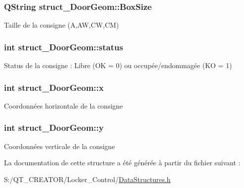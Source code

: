 \subsubsection[{Box\+Size}]{\setlength{\rightskip}{0pt plus 5cm}Q\+String struct\+\_\+\+Door\+Geom\+::\+Box\+Size}\label{structstruct___door_geom_a21703f69a6665c22f39a0345945ccf4f}
Taille de la consigne (A,A\+W,C\+W,C\+M) \hypertarget{structstruct___door_geom_a3c54841ea5b7833ed2fe9d1627e87b42}{}
\subsubsection[{status}]{\setlength{\rightskip}{0pt plus 5cm}int struct\+\_\+\+Door\+Geom\+::status}\label{structstruct___door_geom_a3c54841ea5b7833ed2fe9d1627e87b42}
Status de la consigne \+: Libre (O\+K = 0) ou occupée/endommagée (K\+O = 1) \hypertarget{structstruct___door_geom_ae433a4aa4e4d1949268f5ef7aa84e167}{}
\subsubsection[{x}]{\setlength{\rightskip}{0pt plus 5cm}int struct\+\_\+\+Door\+Geom\+::x}\label{structstruct___door_geom_ae433a4aa4e4d1949268f5ef7aa84e167}
Coordonnées horizontale de la consigne \hypertarget{structstruct___door_geom_acb67782bde0a0ef062f42df2dda50f78}{}
\subsubsection[{y}]{\setlength{\rightskip}{0pt plus 5cm}int struct\+\_\+\+Door\+Geom\+::y}\label{structstruct___door_geom_acb67782bde0a0ef062f42df2dda50f78}
Coordonnées verticale de la consigne 

La documentation de cette structure a été générée à partir du fichier suivant \+:\begin{DoxyCompactItemize}
\item 
S\+:/\+Q\+T\+\_\+\+C\+R\+E\+A\+T\+O\+R/\+Locker\+\_\+\+Control/\hyperlink{_data_structures_8h}{Data\+Structures.\+h}\end{DoxyCompactItemize}

